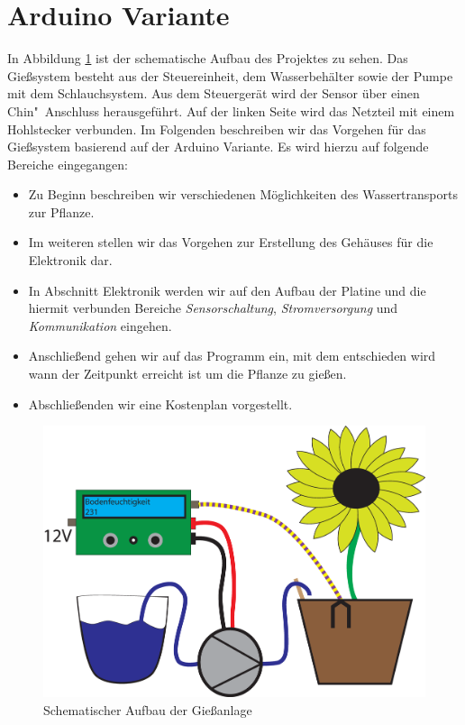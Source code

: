 
\section{Arduino Variante}

In Abbildung \ref{fig-SchemaAufbau} ist der schematische Aufbau des Projektes zu sehen. Das Gießsystem besteht aus der Steuereinheit, dem Wasserbehälter sowie der Pumpe mit dem Schlauchsystem. Aus dem Steuergerät wird der Sensor über einen Chin"~Anschluss herausgeführt. Auf der linken Seite wird das Netzteil mit einem Hohlstecker verbunden. 
Im Folgenden beschreiben wir das Vorgehen für das Gießsystem basierend auf der Arduino Variante. 
Es wird hierzu auf folgende Bereiche eingegangen:

\begin{itemize}
	\item Zu Beginn beschreiben wir verschiedenen Möglichkeiten des Wassertransports zur Pflanze.
	\item Im weiteren stellen wir das Vorgehen zur Erstellung des Gehäuses für die Elektronik dar.
	\item In Abschnitt Elektronik werden wir auf den Aufbau der Platine und die hiermit verbunden Bereiche \emph{Sensorschaltung}, \emph{Stromversorgung} und \emph{Kommunikation} eingehen.
	\item Anschließend gehen wir auf das Programm ein, mit dem entschieden wird wann der Zeitpunkt erreicht ist um die Pflanze zu gießen.
	\item Abschließenden wir eine Kostenplan vorgestellt. 
	
\end{itemize}

	\begin{figure}[!h]
	\centering
	\includegraphics[width=0.9\linewidth]{bilder/Bild_Aufbau.eps}	
	\caption{Schematischer Aufbau der Gießanlage}
	\label{fig-SchemaAufbau}
	\end{figure}

